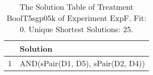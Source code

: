 \begin{table}[ht]
\centering
\begin{tabular}{rp{9cm}}
  \hline
 & Solution \\ 
  \hline
1 & AND(sPair(D1, D5), sPair(D2, D4)) \\ 
   \hline
\end{tabular}
\caption{The Solution Table of Treatment BoolT5sgp05k of Experiment ExpF. Fit: 0. Unique Shortest Solutions: 25.} 
\end{table}
